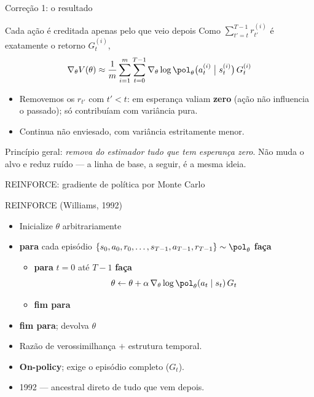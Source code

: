 \documentclass[aspectratio=169, 11pt]{beamer}
\newcommand{\thv}{\theta}                       %
\newcommand{\polth}{\pol_{\thv}}                %
\newcommand{\gth}{\nabla_{\thv}}                %
\begin{document}
\begin{frame}{Correção 1: o resultado}

  \begin{teobox}{Cada ação é creditada apenas pelo que veio depois}
    Como $\sum_{t'=t}^{T-1} r^{(i)}_{t'}$ é exatamente o retorno $G^{(i)}_t$,
    \[
      \gth V(\thv) \approx \frac{1}{m}\sum_{i=1}^{m}\sum_{t=0}^{T-1}
        \gth \log \polth\bigl(a^{(i)}_t\bigm| s^{(i)}_t\bigr)\, G^{(i)}_t
    \]
  \end{teobox}

  \begin{itemize}\setlength{\itemsep}{0.4ex}
    \item Removemos os $r_{t'}$ com $t' < t$: em esperança valiam
      \textbf{zero} (ação não influencia o passado); só contribuíam com
      variância pura.
    \item Continua não enviesado, com variância estritamente menor.
  \end{itemize}

  \begin{ideiabox}
    Princípio geral: \emph{remova do estimador tudo que tem esperança zero}.
    Não muda o alvo e reduz ruído --- a linha de base, a seguir, é a mesma
    ideia.
  \end{ideiabox}
\end{frame}

\begin{frame}{REINFORCE: gradiente de política por Monte Carlo}

  \begin{algbox}{REINFORCE \textnormal{(Williams, 1992)}}
    {\small
    \begin{itemize}\setlength{\itemsep}{0.15ex}
      \item Inicialize $\thv$ arbitrariamente
      \item \textbf{para} cada episódio
        $\{s_0,a_0,r_0,\dots,s_{T-1},a_{T-1},r_{T-1}\} \sim \polth$ \textbf{faça}
        \begin{itemize}\setlength{\itemsep}{0.1ex}
          \item \textbf{para} $t = 0$ até $T-1$ \textbf{faça}
            \[ \thv \leftarrow \thv + \alpha\, \gth \log \polth(a_t\mid s_t)\, G_t \]
          \item \textbf{fim para}
        \end{itemize}
      \item \textbf{fim para}; devolva $\thv$
    \end{itemize}}
  \end{algbox}

  \begin{itemize}\setlength{\itemsep}{0.3ex}
    \item Razão de verossimilhança $+$ estrutura temporal.
    \item \textbf{On-policy}; exige o episódio completo ($G_t$).
    \item 1992 --- ancestral direto de tudo que vem depois.
  \end{itemize}
\end{frame}
\end{document}
